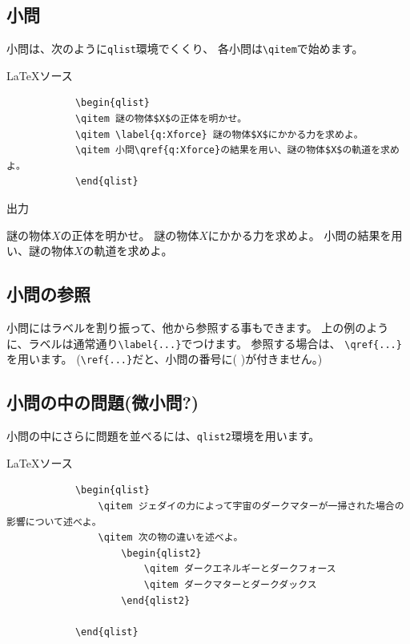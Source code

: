 \documentclass[dvipdfmx,a4j,11pt]{jarticle}
\newenvironment{inputbox}{%
	\begin{itembox}[r]{\LaTeX ソース}
}{
	\end{itembox}
}
\newenvironment{outputbox}{%
	\begin{itembox}[r]{出力}
}{%
	\end{itembox}
}
\begin{document}
	
\subsection{小問}
	 小問は、次のように{\tt qlist}環境でくくり、
	 各小問は{\tt \textbackslash qitem}で始めます。

	 \begin{inputbox}
		\begin{verbatim}
			\begin{qlist}
		    \qitem 謎の物体$X$の正体を明かせ。
		    \qitem \label{q:Xforce} 謎の物体$X$にかかる力を求めよ。
		    \qitem 小問\qref{q:Xforce}の結果を用い、謎の物体$X$の軌道を求めよ。
			\end{qlist}
		\end{verbatim}
	\end{inputbox}
	
	\begin{outputbox}
		\begin{qlist}
		    \qitem 謎の物体$X$の正体を明かせ。
		    \qitem \label{q:Xforce} 謎の物体$X$にかかる力を求めよ。
		    \qitem 小問の結果を用い、謎の物体$X$の軌道を求めよ。
		\end{qlist}
	\end{outputbox}
	
\subsection{小問の参照}
	小問にはラベルを割り振って、他から参照する事もできます。
	上の例のように、ラベルは通常通り{\tt \textbackslash label\{...\}}でつけます。
	参照する場合は、
	{\tt \textbackslash qref\{...\}}を用います。
	({\tt \textbackslash ref\{...\}}だと、小問の番号に( )が付きません。)
	
\subsection{小問の中の問題(微小問?)}
	小問の中にさらに問題を並べるには、{\tt qlist2}環境を用います。
	
	\begin{inputbox}
		\begin{verbatim}
			\begin{qlist}
			    \qitem ジェダイの力によって宇宙のダークマターが一掃された場合の影響について述べよ。
			    \qitem 次の物の違いを述べよ。
			        \begin{qlist2}
			            \qitem ダークエネルギーとダークフォース
			            \qitem ダークマターとダークダックス
			        \end{qlist2}
			        
			\end{qlist}
		\end{verbatim}
	\end{inputbox}
	
\end{document}
